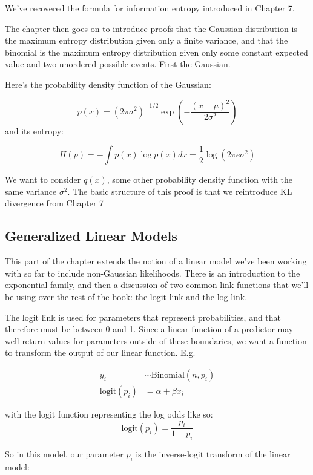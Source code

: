 \documentclass[
]{book}
\begin{document}
We've recovered the formula for information entropy introduced in Chapter 7.

The chapter then goes on to introduce proofs that the Gaussian distribution is the maximum entropy distribution given only a finite variance, and that the binomial is the maximum entropy distribution given only some constant expected value and two unordered possible events. First the Gaussian.

Here's the probability density function of the Gaussian:

\[
p(x) = (2 \pi \sigma^2)^{-1/2} \exp \left( - \frac{(x- \mu)^2}{2 \sigma^2} \right)
\]
and its entropy:

\[
H(p) = - \int p(x) \log p(x) dx = \frac{1}{2} \log(2 \pi e \sigma^2) 
\]

We want to consider \(q(x)\), some other probability density function with the same variance \(\sigma^2\). The basic structure of this proof is that we reintroduce KL divergence from Chapter 7

\hypertarget{generalized-linear-models}{%
\subsection*{Generalized Linear Models}\label{generalized-linear-models}}

This part of the chapter extends the notion of a linear model we've been working with so far to include non-Gaussian likelihoods. There is an introduction to the exponential family, and then a discussion of two common link functions that we'll be using over the rest of the book: the logit link and the log link.

The logit link is used for parameters that represent probabilities, and that therefore must be between 0 and 1. Since a linear function of a predictor may well return values for parameters outside of these boundaries, we want a function to transform the output of our linear function. E.g.

\[
\begin{aligned}
y_i &\sim \text{Binomial}(n,p_i) \\
\text{logit}(p_i) &= \alpha + \beta x_i
\end{aligned}
\]

with the logit function representing the log odds like so:
\[
\text{logit}(p_i) = \frac{p_i}{1 - p_i}
\]

So in this model, our parameter \(p_i\) is the inverse-logit transform of the linear model:
\end{document}
